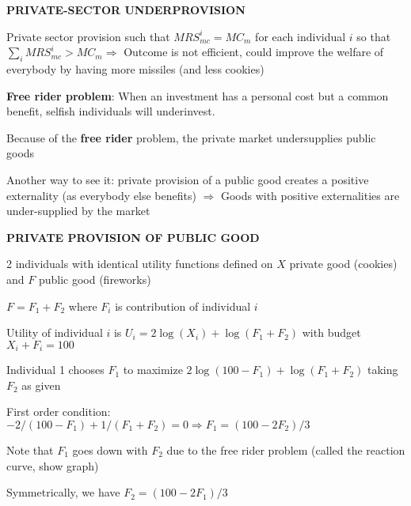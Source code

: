 \documentclass[landscape]{slides}
\begin{document}
\begin{slide}
\begin{center}
{\bf PRIVATE-SECTOR UNDERPROVISION}
\end{center}

Private sector provision such that $MRS^i_{mc} = MC_m$ for each
individual $i$ so that $\sum_i MRS^i_{mc} > MC_m \Rightarrow$ Outcome is not
efficient, could improve the welfare of everybody by having
more missiles (and less cookies)


{\bf Free rider problem}:
When an investment has a personal cost but a common benefit, selfish individuals will underinvest.


Because of the \textbf{free rider} problem, the private market undersupplies
public goods

Another way to see it: private provision of a public good creates
a positive externality (as everybody else benefits) $\Rightarrow$ Goods with
positive externalities are under-supplied by the market

\end{slide}





\begin{slide}
\begin{center}
{\bf PRIVATE PROVISION OF PUBLIC GOOD}
\end{center}

2 individuals with identical utility functions defined on $X$ private good
(cookies) and $F$ public good (fireworks)

$F=F_1+F_2$ where $F_i$ is contribution of individual $i$

Utility of individual $i$ is $U_i=2\log(X_i)+\log(F_1+F_2)$ with budget $X_i+F_i=100$

Individual 1 chooses $F_1$ to maximize $2\log(100-F_1)+\log(F_1+F_2)$ taking
$F_2$ as given

First order condition: $-2/(100-F_1)+1/(F_1+F_2)=0 \Rightarrow F_1=(100-2F_2)/3$

Note that $F_1$ goes down with $F_2$ due to the free rider problem (called the
reaction curve, show graph)

Symmetrically, we have $F_2=(100-2F_1)/3$


\end{slide}



\begin{slide}

\end{slide}
\end{document}
